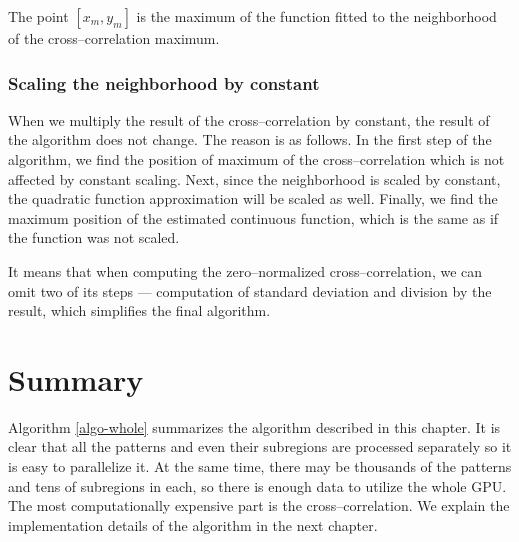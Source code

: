 The point $[x_m, y_m]$ is the maximum of the function fitted to the neighborhood of the cross--correlation maximum.

\subsubsection{Scaling the neighborhood by constant}

When we multiply the result of the cross--correlation by constant, the result of the algorithm does not change. The reason is as follows. In the first step of the algorithm, we find the position of maximum of the cross--correlation which is not affected by constant scaling. Next, since the neighborhood is scaled by constant, the quadratic function approximation will be scaled as well. Finally, we find the maximum position of the estimated continuous function, which is the same as if the function was not scaled.

It means that when computing the zero--normalized cross--correlation, we can omit two of its steps --- computation of standard deviation and division by the result, which simplifies the final algorithm.

\section{Summary}

Algorithm \ref{algo-whole} summarizes the algorithm described in this chapter. It is clear that all the patterns and even their subregions are processed separately so it is easy to parallelize it. At the same time, there may be thousands of the patterns and tens of subregions in each, so there is enough data to utilize the whole GPU. The most computationally expensive part is the cross--correlation. We explain the implementation details of the algorithm in the next chapter.

